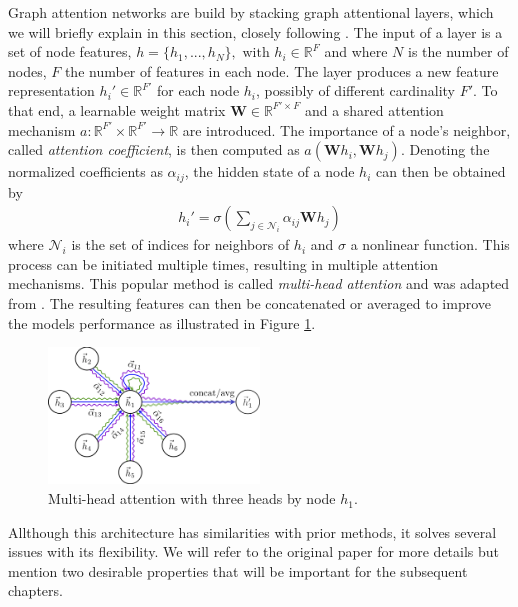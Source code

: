 \label{chapter:GAT Architecture}

Graph attention networks are build by stacking graph attentional layers, which we will briefly explain in this section, closely following \cite{velickovic2018graph}. The input of a layer is a set of node features, $h = \{h_1,...,h_N\}, \text{ with }h_i \in \mathbb{R}^F$ and where $N$ is the number of nodes, $F$ the number of features in each node. The layer produces a new feature representation $h_i' \in \mathbb{R}^{F'}$ for each node $h_i$, possibly of different cardinality $F'$. To that end, a learnable weight matrix $\mathbf{W} \in \mathbb{R}^{F' \times F}$ and a shared attention mechanism $a: \mathbb{R}^{F'} \times \mathbb{R}^{F'} \rightarrow \mathbb{R}$ are introduced. The importance of a node's neighbor, called \textit{attention coefficient}, is then computed as $a(\mathbf{W}h_i, \mathbf{W}h_j)$. Denoting the normalized coefficients as $\alpha_{ij}$, the hidden state of a node $h_i$ can then be obtained by
\begin{align*}
    h_i' = \sigma(\sum_{j \in \mathcal{N}_i} \alpha_{ij}\mathbf{W}h_j)
\end{align*}
where $\mathcal{N}_i$ is the set of indices for neighbors of $h_i$ and $\sigma$ a nonlinear function. This process can be initiated multiple times, resulting in multiple attention mechanisms. This popular method is called \textit{multi-head attention} and was adapted from \cite{vaswani2017attention}. The resulting features can then be concatenated or averaged to improve the models performance  as illustrated in Figure \ref{fig:multi-head}.

\begin{figure}[h]
    \centering
    \includegraphics[width=0.5\textwidth]{img/multi_head.png}
    \caption{Multi-head attention with three heads by node $h_1$. \cite{velickovic2018graph}}
    \label{fig:multi-head}
\end{figure}
Allthough this architecture has similarities with prior methods, it solves several issues with its flexibility. We will refer to the original paper for more details but mention two desirable properties that will be important for the subsequent chapters.


